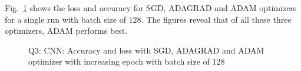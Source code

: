 Fig.~\ref{fig:q3_loss_acc_128} shows the loss and accuracy for SGD, ADAGRAD and ADAM optimizers for a single run with batch size of $128$. The figures reveal that of all these three optimizers, ADAM performs best.
\begin{figure}[!h]
	\centering
	\hspace{0.5cm}
	\hspace{0.5cm}
	\caption{Q3: CNN: Accuracy and loss with SGD, ADAGRAD and ADAM optimizer with increasing epoch with batch size of 128}
	\label{fig:q3_loss_acc_128}
\end{figure}
